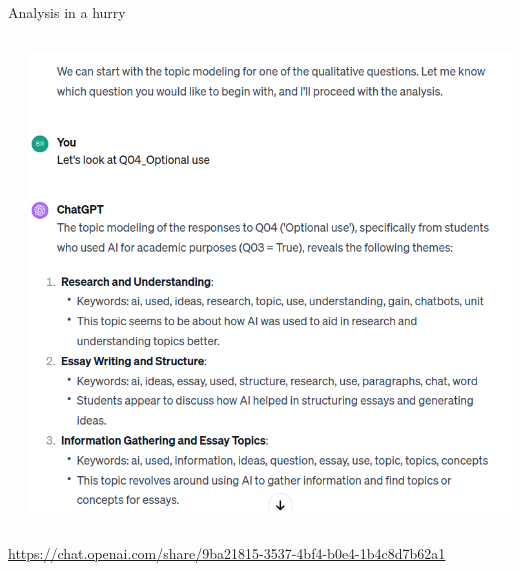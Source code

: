 \documentclass[xcolor={dvipsnames},aspectratio=169]{beamer}
\begin{document}
\begin{frame}{Analysis in a hurry}
\begin{columns}
\begin{column}{0.3\textwidth}
\end{column}
\begin{column}{0.3\textwidth}
\includegraphics[width=\textwidth]{Screenshot from 2023-12-12 11-31-54.png}
\end{column}
\end{columns}

{\tiny
\url{https://chat.openai.com/share/9ba21815-3537-4bf4-b0e4-1b4c8d7b62a1}
}

\end{frame}
\end{document}
